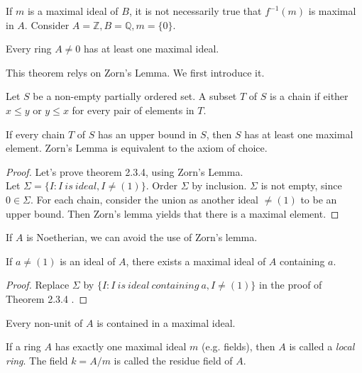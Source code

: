 \documentclass[11pt,fleqn]{book} %
\begin{document}
\begin{CJK}{UTF8}{gkai}
\begin{remark}
	If $m$ is a maximal ideal of $B$, it is not necessarily true that $f^{-1}(m)$ is maximal in $A$. Consider $A = \mathbb{Z}, B = \mathbb{Q}, m = \{0\}$.
\end{remark}

\begin{theorem}
	Every ring $A \neq 0$ has at least one maximal ideal.
\end{theorem}
This theorem relys on Zorn's Lemma. We first introduce it.

\begin{definition}
	 Let $S$ be a non-empty partially ordered set. A subset $T$ of $S$ is a chain if either $x \leq y$ or $y \leq x$ for every pair of elements in $T$.
\end{definition}

\begin{lemma}
	[Zorn] If every chain $T$ of $S$ has an upper bound in $S$, then $S$ has at least one maximal element. Zorn's Lemma is equivalent to the axiom of choice.
\end{lemma}

\begin{proof}
	Let's prove theorem 2.3.4, using Zorn's Lemma. \\
	Let $\Sigma = \{I : I \ is \ ideal, I \neq (1)\}$. Order $\Sigma$ by inclusion. $\Sigma$ is not empty, since $0 \in \Sigma$. For each chain, consider the union as another ideal $\neq (1)$ to be an upper bound. Then Zorn's lemma yields that there is a maximal element.
\end{proof}
\begin{remark}
	If $A$ is Noetherian, we can avoid the use of Zorn's lemma.	
\end{remark}

\begin{corollary}
	If $a \neq (1)$ is an ideal of $A$, there exists a maximal ideal of $A$ containing $a$.
\end{corollary}
\begin{proof}
	Replace $\Sigma$ by $\{I: I \ is \ ideal \ containing \ a, I \neq (1)\}$ in the proof of Theorem 2.3.4 .
\end{proof}

\begin{corollary}
	Every non-unit of $A$ is contained in a maximal ideal.
\end{corollary}

\begin{definition}
	 If a ring $A$ has exactly one maximal ideal $m$ (e.g. fields), then $A$ is called a {\it local ring}. The field $k = A/m$ is called the residue field of $A$.
\end{definition}


\end{CJK}
\end{document}
